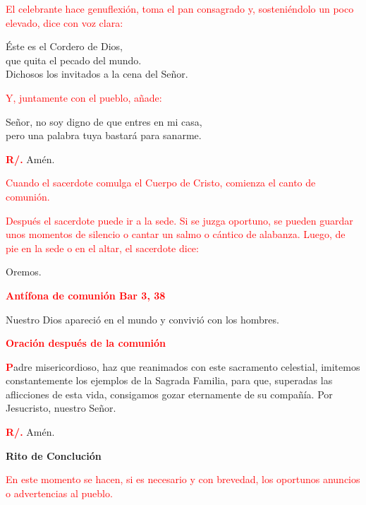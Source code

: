 \documentclass[12pt, letterpaper]{report}
\begin{document}
\large{\textcolor{red}{El celebrante hace genuflexi\'on, toma el pan consagrado y, sosteni\'endolo un poco elevado, dice con voz clara:}}

\noindent
\Large \'Este es el Cordero de Dios,\\ 
que quita el pecado del mundo.\\ 
Dichosos los invitados a la cena del Se\~nor.

\large{\textcolor{red}{Y, juntamente con el pueblo, a\~nade:}}

\noindent
\Large Se\~nor, no soy digno de que entres en mi casa,\\ 
pero una palabra tuya bastar\'a para sanarme.

\noindent
\Large {\bfseries \textcolor{red}{R/.}} \hspace{0.5cm} Am\'en.

\large{\textcolor{red}{Cuando el sacerdote comulga el Cuerpo de Cristo, comienza el canto de comuni\'on.}}

\large{\textcolor{red}{Despu\'es el sacerdote puede ir a la sede. Si se juzga oportuno, se pueden guardar unos momentos de silencio o cantar un salmo o c\'antico de alabanza. Luego, de pie en la sede o en el altar, el sacerdote dice:}}

\Large Oremos.

\large {\bfseries \textcolor{red}{Ant\'ifona de comuni\'on \hspace{1cm} Bar 3, 38}}

\Large Nuestro Dios apareci\'o en el mundo y convivi\'o con los hombres.

\large {\bfseries \textcolor{red}{Oraci\'on despu\'es de la comuni\'on}}

\lettrine[lines=1]{\bfseries \textcolor{red}{P}}{}\Large adre misericordioso, haz que reanimados con este sacramento celestial, imitemos constantemente los ejemplos de la Sagrada Familia, para que, superadas las aflicciones de esta vida, consigamos gozar eternamente de su compa\~n\'ia. Por Jesucristo, nuestro Se\~nor.

\noindent
\Large {\bfseries \textcolor{red}{R/.}} \hspace{0.5cm} Am\'en.

\newpage

\begin{center}
\Huge {\bfseries Rito de Concluci\'on}
\end{center}

\large{\textcolor{red}{En este momento se hacen, si es necesario y con brevedad, los oportunos anuncios o advertencias al pueblo.}}
\end{document}
